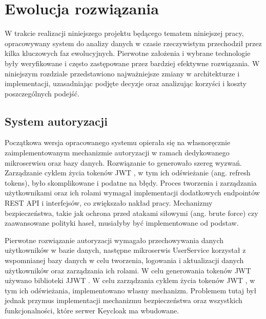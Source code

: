 \section{Ewolucja rozwiązania}
\label{chap:ewolucja_rozwiazania}


W trakcie realizacji niniejszego projektu będącego tematem niniejszej pracy, opracowywany system do analizy danych w czasie rzeczywistym przechodził przez kilka kluczowych faz ewolucyjnych. Pierwotne założenia i wybrane technologie były weryfikowane i często zastępowane przez bardziej efektywne rozwiązania. W niniejszym rozdziale przedstawiono najważniejsze zmiany w architekturze i implementacji, uzasadniając podjęte decyzje oraz analizując korzyści i koszty poszczególnych podejść.

\subsection{System autoryzacji}

Początkowa wersja opracowanego systemu opierała się na własnoręcznie zaimplementowanym mechanizmie autoryzacji w ramach dedykowanego mikroserwisu oraz bazy danych. Rozwiązanie to generowało szereg wyzwań. Zarządzanie cyklem życia tokenów JWT \cite{jwt_rfc}, w tym ich odświeżanie (ang. refresh tokens), było skomplikowane i podatne na błędy. Proces tworzenia i zarządzania użytkownikami oraz ich rolami wymagał implementacji dodatkowych endpointów REST API i interfejsów, co zwiększało nakład pracy. Mechanizmy bezpieczeństwa, takie jak ochrona przed atakami siłowymi (ang. brute force) czy zaawansowane polityki haseł, musiałyby być implementowane od podstaw.

Pierwotne rozwiązanie autoryzacji wymagało przechowywania danych użytkowników w bazie danych, następne mikroserwis UserService korzystał z wspomnianej bazy danych w celu tworzenia, logowania i aktualizacji danych użytkowników oraz zarządzania ich rolami. W celu generowania tokenów JWT \cite{jwt_rfc} używano biblioteki JJWT \cite{jjwt_docs}. W celu zarządzania cyklem życia tokenów JWT \cite{jwt_rfc}, w tym ich odświeżania, implementowano własny mechanizm. Problemem tutaj był jednak przymus implementacji mechanizmu bezpieczeństwa oraz wszystkich funkcjonalności, które serwer Keycloak ma wbudowane.

\vspace{0.3em}

